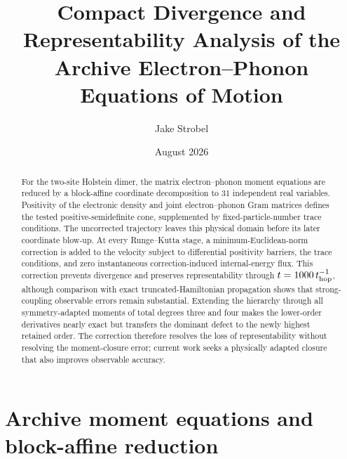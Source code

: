 \documentclass[10pt,twocolumn]{article}
\title{Compact Divergence and Representability Analysis of the Archive
Electron--Phonon Equations of Motion}
\author{Jake Strobel}
\date{August 2026}
\begin{document}
\maketitle

\begin{abstract}
For the two-site Holstein dimer, the matrix electron--phonon moment equations
are reduced by a block-affine coordinate decomposition to 31 independent real
variables.  Positivity of the electronic density and joint electron--phonon
Gram matrices defines the tested positive-semidefinite cone, supplemented by
fixed-particle-number trace conditions.  The uncorrected trajectory leaves
this physical domain before its later coordinate blow-up.  At every
Runge--Kutta stage, a minimum-Euclidean-norm correction is added to the
velocity subject to differential positivity barriers, the trace conditions,
and zero instantaneous correction-induced internal-energy flux.  This
correction prevents divergence and preserves representability through
$t=1000\,t_{\rm hop}^{-1}$, although comparison with exact
truncated-Hamiltonian propagation shows that strong-coupling observable errors
remain substantial.  Extending the hierarchy through all symmetry-adapted
moments of total degrees three and four makes the lower-order derivatives
nearly exact but transfers the dominant defect to the newly highest retained
order.  The correction therefore resolves the loss of representability
without resolving the moment-closure error; current work seeks a physically
adapted closure that also improves observable accuracy.
\end{abstract}

\section{Archive moment equations and block-affine reduction}
\end{document}
